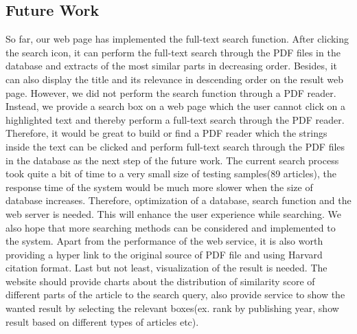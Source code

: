 
\subsection{Future Work}
So far, our web page has  implemented the full-text search function. After clicking the search icon, it can perform the full-text search through the PDF files in the database and extracts of the most similar parts in decreasing order. Besides, it can also display the title and its relevance in descending order  on the result web page.
However, we did not perform the search function through a PDF reader. Instead, we provide a search box on a web page which the user cannot click on a highlighted text and thereby perform a full-text search through the PDF reader. Therefore, it would be great to build or find a PDF reader which the strings inside the text can be clicked and perform full-text search through the PDF files in the database as the next step of the future work. The current search process took quite a bit of time  to  a very small size of testing samples(89 articles), the response time of the system would be much more slower when the size of database increases. Therefore, optimization of  a database, search function and the web server is needed. This will enhance the user experience while searching. We also hope that more searching methods can be considered and implemented to the system. Apart from the performance of the web service, it is also worth providing a  hyper link to the original source of PDF file and using Harvard citation format.
Last but not least, visualization of the result is needed. The website should provide charts about the distribution of similarity score of different parts of  the article to the search query, also provide service to show the wanted result by selecting the relevant boxes(ex. rank by publishing year, show result based on different types of articles etc).
